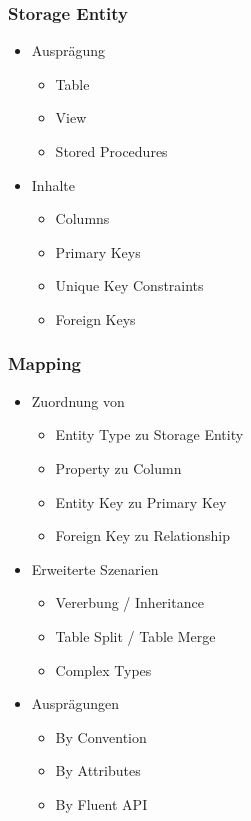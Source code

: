 \subsubsection{Storage Entity}
\begin{itemize}
    \item Ausprägung
    \begin{itemize}
        \item Table
        \item View
        \item Stored Procedures
    \end{itemize}
    \item Inhalte
    \begin{itemize}
        \item Columns
        \item Primary Keys
        \item Unique Key Constraints
        \item Foreign Keys
    \end{itemize}
\end{itemize}

\subsubsection{Mapping}
\begin{itemize}
    \item Zuordnung von
    \begin{itemize}
        \item Entity Type zu Storage Entity
        \item Property zu Column
        \item Entity Key zu Primary Key
        \item Foreign Key zu Relationship
    \end{itemize}
    \item Erweiterte Szenarien
    \begin{itemize}
        \item Vererbung / Inheritance
        \item Table Split / Table Merge
        \item Complex Types
    \end{itemize}
    \item Ausprägungen
    \begin{itemize}
        \item By Convention
        \item By Attributes
        \item By Fluent API
    \end{itemize}
\end{itemize}


